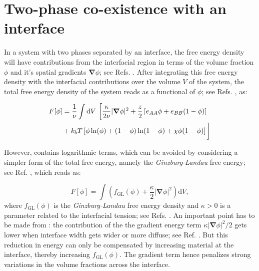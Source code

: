\section{Two-phase co-existence with an interface}

In a system with two phases separated by an interface, the free energy density will have contributions from the interfacial region in terms of the volume fraction $\phi$ and it's spatial gradients $\boldsymbol{\nabla} \phi$; see Refs. \cite{Review2019,Cahn1958}.
After integrating this free energy density with the interfacial contributions over the volume $V$ of the system, the total free energy density of the system reads as a functional of $\phi$; see Refs. \cite{Review2019,Cahn1958}, as:

\begin{equation}
\label{eqn:total_free_energy_FL}
\begin{split}
F[\phi] &= \frac{1}{\nu} \int \mathrm{d}V~ \bigg{[} \frac{\kappa}{2 \nu} |\boldsymbol{\nabla} \phi|^2 + \frac{z}{2} \left[ e_{AA} \phi +  e_{BB} (1 - \phi)\right] \\ & +  k_b T \left[ \phi \ln(\phi) + (1 - \phi) \ln (1 - \phi) + \chi \phi (1 - \phi) \right] \bigg{]}
\end{split}
\end{equation}

However,  contains logarithmic terms, which can be avoided by considering a simpler form of the total free energy, namely the \textit{Ginzburg-Landau} free energy; see Ref. \cite{Review2019}, which reads as:

\begin{equation}
\label{eqn:total_free_energy_GL}
    F[\phi] = \int \left( f_{\mathrm{GL}}(\phi) +  \frac{\kappa}{2} |\boldsymbol{\nabla} \phi|^2 \right) \mathrm{d}V,
\end{equation}
where $f_{\mathrm{GL}}(\phi)$ is the \textit{Ginzburg-Landau} free energy density and $\kappa > 0$ is a parameter related to the interfacial tension; see Refs. \cite{Zwicker2015,Review2019}.
An important point has to be made from : the contribution of the the gradient energy term $\kappa|\boldsymbol{\nabla} \phi|^2 / 2$ gets lower when interface width gets wider or more diffuse; see Ref. \cite{Cahn1958}.
But this reduction in energy can only be compensated by increasing material at the interface, thereby increasing $f_{\mathrm{GL}}(\phi)$.
The gradient term hence penalizes strong variations in the volume fractions across the interface.

